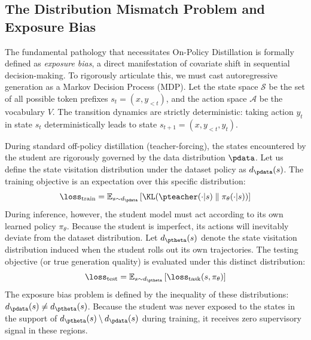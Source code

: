 \subsection{The Distribution Mismatch Problem and Exposure Bias}
\label{subsec:exposure_bias}

The fundamental pathology that necessitates On-Policy Distillation is formally defined as \textit{exposure bias}, a direct manifestation of covariate shift in sequential decision-making. To rigorously articulate this, we must cast autoregressive generation as a Markov Decision Process (MDP). Let the state space $\mathcal{S}$ be the set of all possible token prefixes $s_t = (x, y_{<t})$, and the action space $\mathcal{A}$ be the vocabulary $V$. The transition dynamics are strictly deterministic: taking action $y_t$ in state $s_t$ deterministically leads to state $s_{t+1} = (x, y_{<t}, y_t)$. 

During standard off-policy distillation (teacher-forcing), the states encountered by the student are rigorously governed by the data distribution $\pdata$. Let us define the state visitation distribution under the dataset policy as $d_{\pdata}(s)$. The training objective is an expectation over this specific distribution:
\begin{equation}
    \loss_{\mathrm{train}} = \mathbb{E}_{s \sim d_{\pdata}} \left[ \KL(\pteacher(\cdot|s) \parallel \pi_\theta(\cdot|s)) \right]
\end{equation}
During inference, however, the student model must act according to its own learned policy $\pi_\theta$. Because the student is imperfect, its actions will inevitably deviate from the dataset distribution. Let $d_{\ptheta}(s)$ denote the state visitation distribution induced when the student rolls out its own trajectories. The testing objective (or true generation quality) is evaluated under this distinct distribution:
\begin{equation}
    \loss_{\mathrm{test}} = \mathbb{E}_{s \sim d_{\ptheta}} \left[ \loss_{\mathrm{task}}(s, \pi_\theta) \right]
\end{equation}
The exposure bias problem is defined by the inequality of these distributions: $d_{\pdata}(s) \neq d_{\ptheta}(s)$. Because the student was never exposed to the states in the support of $d_{\ptheta}(s) \setminus d_{\pdata}(s)$ during training, it receives zero supervisory signal in these regions. 

